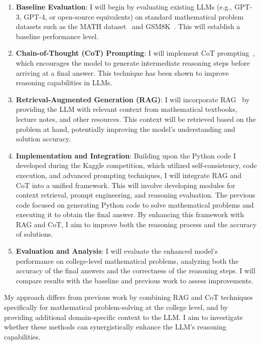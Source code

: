 \documentclass[11pt,a4paper]{article}
\begin{document}
\begin{enumerate}
    \item \textbf{Baseline Evaluation}: I will begin by evaluating existing LLMs (e.g., GPT-3, GPT-4, or open-source equivalents) on standard mathematical problem datasets such as the MATH dataset~\cite{hendrycks2021measuring} and GSM8K~\cite{cobbe2021training}. This will establish a baseline performance level.

    \item \textbf{Chain-of-Thought (CoT) Prompting}: I will implement CoT prompting~\cite{wei2022chain}, which encourages the model to generate intermediate reasoning steps before arriving at a final answer. This technique has been shown to improve reasoning capabilities in LLMs.

    \item \textbf{Retrieval-Augmented Generation (RAG)}: I will incorporate RAG~\cite{lewis2020retrieval} by providing the LLM with relevant context from mathematical textbooks, lecture notes, and other resources. This context will be retrieved based on the problem at hand, potentially improving the model's understanding and solution accuracy.

    \item \textbf{Implementation and Integration}: Building upon the Python code I developed during the Kaggle competition, which utilized self-consistency, code execution, and advanced prompting techniques, I will integrate RAG and CoT into a unified framework. This will involve developing modules for context retrieval, prompt engineering, and reasoning evaluation. The previous code focused on generating Python code to solve mathematical problems and executing it to obtain the final answer. By enhancing this framework with RAG and CoT, I aim to improve both the reasoning process and the accuracy of solutions.

    \item \textbf{Evaluation and Analysis}: I will evaluate the enhanced model's performance on college-level mathematical problems, analyzing both the accuracy of the final answers and the correctness of the reasoning steps. I will compare results with the baseline and previous work to assess improvements.
\end{enumerate}

My approach differs from previous work by combining RAG and CoT techniques specifically for mathematical problem-solving at the college level, and by providing additional domain-specific context to the LLM. I aim to investigate whether these methods can synergistically enhance the LLM's reasoning capabilities.
\end{document}
